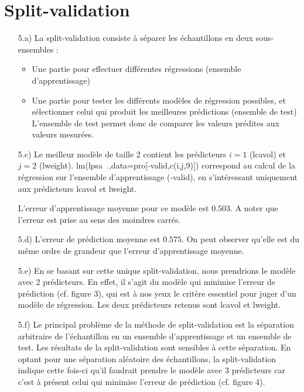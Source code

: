 \documentclass[a4paper, 12pt]{article}
\begin{document}
\section{Split-validation}

\begin{enumerate}
\setlength{\itemsep}{20pt}

\item[5.a)] La split-validation consiste à séparer les échantillons en deux sous-ensembles :

\begin{itemize}
\item Une partie pour effectuer différentes régressions (ensemble d'apprentissage)
\item Une partie pour tester les différents modèles de régression possibles, et sélectionner celui qui produit les meilleures prédictions (ensemble de test)
L'ensemble de test permet donc de comparer les valeurs prédites aux valeurs mesurées.
\end{itemize}

\item[5.c)] Le meilleur modèle de taille 2 contient les prédicteurs $i = 1$ (lcavol) et $j = 2$ (lweight). lm(lpsa~.,data=pro[-valid,c(i,j,9)]) correspond au calcul de la régression sur l'ensemble d'apprentissage (-valid), en s'intéressant uniquement aux prédicteurs lcavol et lweight.

L'erreur d'apprentissage moyenne pour ce modèle est $0.503$. A noter que l'erreur est prise au sens des moindres carrés.

\item[5.d)] L'erreur de prédiction moyenne est $0.575$. On peut observer qu'elle est du même ordre de grandeur que l'erreur d'apprentissage moyenne.

\item[5.e)] En se basant sur cette unique split-validation, nous prendrions le modèle avec 2 prédicteurs. En effet, il s'agit du modèle qui minimise l'erreur de prédiction (cf. figure 3), qui est à nos yeux le critère essentiel pour juger d'un modèle de régression. Les deux prédicteurs retenus sont lcavol et lweight.

\item[5.f)] Le principal problème de la méthode de split-validation est la séparation arbitraire de l'échantillon en un ensemble d'apprentissage et un ensemble de test. Les résultats de la split-validation sont sensibles à cette séparation. En optant pour une séparation aléatoire des échantillons, la split-validation indique cette fois-ci qu'il faudrait prendre le modèle avec 3 prédicteurs car c'est à présent celui qui minimise l'erreur de prédiction (cf. figure 4).


\end{enumerate}
\end{document}
